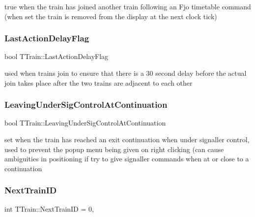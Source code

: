 true when the train has joined another train following an \textquotesingle{}Fjo\textquotesingle{} timetable command (when set the train is removed from the display at the next clock tick) \mbox{\label{class_t_train_a1b53d5506e8a5bdfd55286ae2dc2d3f2}} 
\subsubsection{\texorpdfstring{Last\+Action\+Delay\+Flag}{LastActionDelayFlag}}
{\footnotesize\ttfamily bool T\+Train\+::\+Last\+Action\+Delay\+Flag\hspace{0.3cm}{\ttfamily [private]}}

used when trains join to ensure that there is a 30 second delay before the actual join takes place after the two trains are adjacent to each other \mbox{\label{class_t_train_ac1ce3c1b548c1e4199d211b5fcd9763e}} 
\subsubsection{\texorpdfstring{Leaving\+Under\+Sig\+Control\+At\+Continuation}{LeavingUnderSigControlAtContinuation}}
{\footnotesize\ttfamily bool T\+Train\+::\+Leaving\+Under\+Sig\+Control\+At\+Continuation\hspace{0.3cm}{\ttfamily [private]}}

set when the train has reached an exit continuation when under signaller control, used to prevent the popup menu being given on right clicking (can cause ambiguities in positioning if try to give signaller commands when at or close to a continuation \mbox{\label{class_t_train_a59a6ad055b319a73e954e9bef5f7593c}} 
\subsubsection{\texorpdfstring{Next\+Train\+ID}{NextTrainID}}
{\footnotesize\ttfamily int T\+Train\+::\+Next\+Train\+ID = 0\hspace{0.3cm}{\ttfamily [static]}, {\ttfamily [private]}}

